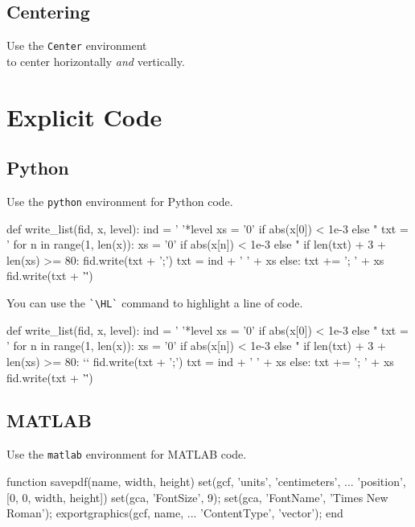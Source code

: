 \documentclass{antclass}
\newif\ifshow\showtrue
\begin{document}
\section{Centering}

\begin{Center}
    \Large Use the \texttt{Center} environment \\
    to center horizontally \emph{and} vertically.
\end{Center}

\chapter{Explicit Code}

\section{Python}\onecolumn

\ifshow
Use the \verb|python| environment for Python code.
\begin{python}
def write_list(fid, x, level):
    ind = '  '*level
    xs = '0' if abs(x[0]) < 1e-3 else "%
    txt = '\n%
    for n in range(1, len(x)):
        xs = '0' if abs(x[n]) < 1e-3 else "%
        if len(txt) + 3 + len(xs) >= 80:
            fid.write(txt + ';\n')
            txt = ind + '  ' + xs
        else:
            txt += '; ' + xs
    fid.write(txt + '\"')
\end{python}
\pagebreak\addtocounter{page}{-1}
\fi
You can use the \verb|`\HL`| command to highlight a line of code.
\begin{python}
def write_list(fid, x, level):
    ind = '  '*level
    xs = '0' if abs(x[0]) < 1e-3 else "%
    txt = '\n%
    for n in range(1, len(x)):
        xs = '0' if abs(x[n]) < 1e-3 else "%
        if len(txt) + 3 + len(xs) >= 80:
`\HL`            fid.write(txt + ';\n')
            txt = ind + '  ' + xs
        else:
            txt += '; ' + xs
    fid.write(txt + '\"')
\end{python}

\section{MATLAB}

Use the \verb|matlab| environment for MATLAB code.
\begin{matlab}
function savepdf(name, width, height)
    set(gcf, 'units', 'centimeters', ...
        'position', [0, 0, width, height])
    set(gca, 'FontSize', 9);
    set(gca, 'FontName', 'Times New Roman');
    exportgraphics(gcf, name, ...
        'ContentType', 'vector');
end
\end{matlab}
\end{document}
